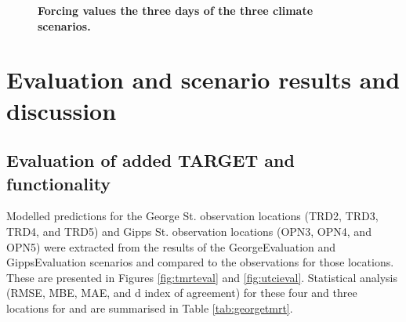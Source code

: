 \documentclass[final,3p,times,authoryear]{elsarticle}
\begin{document}
\begin{figure}[!htbp]
\caption{\bf Forcing values the three days of the three climate scenarios. }    
 \label{fig:sunburyforcing} 
\end{figure} 




\section{Evaluation and scenario results and discussion}

\subsection{Evaluation of added TARGET  and  functionality}\label{sec:eval-htc}


Modelled predictions for the George St. observation locations (TRD2, TRD3, TRD4, and TRD5) and Gipps St. observation locations (OPN3, OPN4, and OPN5) were extracted from the results of the GeorgeEvaluation and GippsEvaluation scenarios and compared to the observations for those locations. These are presented in Figures \ref{fig:tmrteval} and \ref{fig:utcieval}. Statistical analysis (RMSE, MBE, MAE, and d index of agreement) for these four and three locations for  and  are summarised in Table \ref{tab:georgetmrt}.
\end{document}
